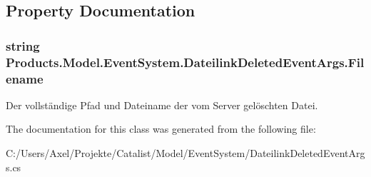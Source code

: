 \subsection{Property Documentation}
\subsubsection[{\texorpdfstring{Filename}{Filename}}]{\setlength{\rightskip}{0pt plus 5cm}string Products.\+Model.\+Event\+System.\+Dateilink\+Deleted\+Event\+Args.\+Filename\hspace{0.3cm}{\ttfamily [get]}}\hypertarget{class_products_1_1_model_1_1_event_system_1_1_dateilink_deleted_event_args_ac261c213281ae3893e5728c1d2ebcb04}{}\label{class_products_1_1_model_1_1_event_system_1_1_dateilink_deleted_event_args_ac261c213281ae3893e5728c1d2ebcb04}


Der vollständige Pfad und Dateiname der vom Server gelöschten Datei. 



The documentation for this class was generated from the following file\+:\begin{DoxyCompactItemize}
\item 
C\+:/\+Users/\+Axel/\+Projekte/\+Catalist/\+Model/\+Event\+System/Dateilink\+Deleted\+Event\+Args.\+cs\end{DoxyCompactItemize}
